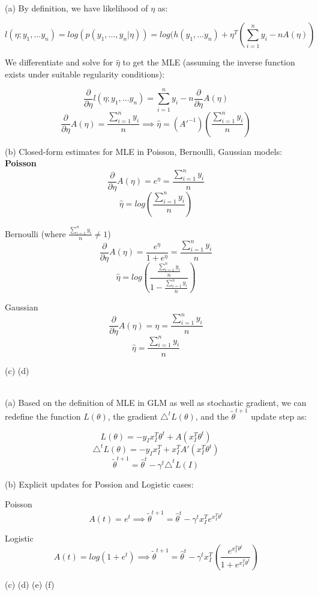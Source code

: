 \documentclass[11pt]{article}
\newenvironment{problem}[2][Problem]{\begin{trivlist}
\item[\hskip \labelsep {\bfseries #1}\hskip \labelsep {\bfseries #2.}]}{\end{trivlist}}
\begin{document}
\begin{problem}{2.3}
\text{ }\\

(a) By definition, we have likelihood of $\eta$ as:

\[l(\eta; y_1,...y_n) = log(p(y_1,...,y_n|\eta)) = log(h(y_1,...y_n) + \eta^T(\sum^{n}_{i=1}y_i-nA(\eta))\]

\begin{adjustwidth}{2.5em}{0pt}
We differentiate and solve for $\hat{\eta}$ to get the MLE (assuming the inverse function exists under suitable regularity conditions):
\end{adjustwidth}

\[\frac{\partial}{\partial\eta}l(\eta; y_1,...y_n) = \sum^{n}_{i=1}y_i-n\frac{\partial}{\partial\eta}A(\eta)\]
\[\frac{\partial}{\partial\eta}A(\eta) = \frac{\sum^{n}_{i=1}y_i}{n} \implies \hat{\eta} = (A'^{-1})(\frac{\sum^{n}_{i=1}y_i}{n})\]

(b) Closed-form estimates for MLE in Poisson, Bernoulli, Gaussian models:
\\

\bf{Poisson}
\[\frac{\partial}{\partial\eta}A(\eta) = e^{\eta} = \frac{\sum^{n}_{i=1}y_i}{n}\]
\[\hat{\eta} = log(\frac{\sum^{n}_{i=1}y_i}{n}) \]

Bernoulli (where $\frac{\sum^{n}_{i=1}y_i}{n} \neq 1$)
\[\frac{\partial}{\partial\eta}A(\eta) = \frac{e^{\eta}}{1+e^{\eta}} = \frac{\sum^{n}_{i=1}y_i}{n}\]
\[\hat{\eta} = log(\frac{\frac{\sum^{n}_{i=1}y_i}{n}}{1-\frac{\sum^{n}_{i=1}y_i}{n}})\]

Gaussian
\[\frac{\partial}{\partial\eta}A(\eta) = \eta = \frac{\sum^{n}_{i=1}y_i}{n} \]
\[\hat{\eta} = \frac{\sum^{n}_{i=1}y_i}{n}\]

{\color{red} (c) (d)}
\end{problem}


\begin{problem}{2.4}
\text{ }\\

(a) Based on the definition of MLE in GLM as well as stochastic gradient, we can redefine the function $L(\theta)$, the gradient $\triangle^{t} L(\theta)$, and the $\tilde{\theta}^{t+1}$ update step as:

\[L(\theta) = -y_{I}x^{T}_{I}\theta^{t} + A(x^{T}_{I}\theta^{t})\]
\[\triangle^{t}L(\theta) = -y_{I}x^{T}_{I} + x^{T}_{I}A'(x^{T}_{I}\theta^{t})\]
\[\tilde{\theta}^{t+1} = \hat{\theta}^{t} - \gamma^{t} \triangle^{t}L(I)\]

(b) Explicit updates for Possion and Logistic cases:

Poisson
\[A(t) = e^{t} \implies \tilde{\theta}^{t+1} = \hat{\theta}^{t} - \gamma^{t} x^{T}_{I}e^{x^{T}_{I}\theta^{t}}\]

Logistic
\[A(t) = log(1+e^{t}) \implies \tilde{\theta}^{t+1} = \hat{\theta}^{t} - \gamma^{t} x^{T}_{I}(\frac{e^{x^{T}_{I}\theta^{t}}}{1+e^{x^{T}_{I}\theta^{t}}})\]

{\color{red}(c) (d) (e) (f)}

\end{problem}
\end{document}
